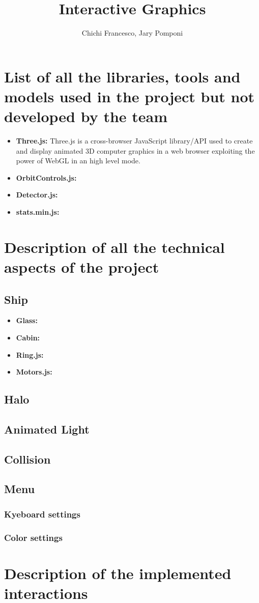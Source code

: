 \documentclass[11pt]{article}
\title{Interactive Graphics}
\author{Chichi Francesco, Jary Pomponi}
\begin{document}
\maketitle


\section{List of all the libraries, tools and models used in the project but	not developed by the team}
\begin{itemize}
	\item \textbf{Three.js:}
		Three.js is a cross-browser JavaScript library/API used to create and display animated 3D computer graphics in a web browser exploiting the power of WebGL in an high level mode.
	\item \textbf{OrbitControls.js:}
	\item \textbf{Detector.js:}
	\item \textbf{stats.min.js:}
\end{itemize}
\section{Description of all the technical aspects of the project}
\subsection{Ship}
\begin{itemize}
	\item \textbf{Glass:}
	\item \textbf{Cabin:}
	\item \textbf{Ring.js:}
	\item \textbf{Motors.js:}
\end{itemize}
\subsection{Halo}
\subsection{Animated Light}
\subsection{Collision}
\subsection{Menu}
\subsubsection{Kyeboard settings}
\subsubsection{Color settings}


\section{Description of the implemented interactions}
\end{document}
